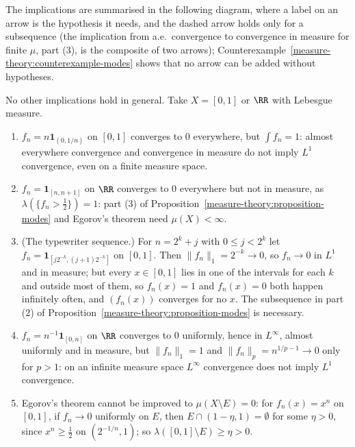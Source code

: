 The implications are summarised in the following diagram, where a label on an arrow is the hypothesis it needs, and the dashed arrow holds only for a subsequence (the
implication from a.e.\ convergence to convergence in measure for finite $\mu$, part (3), is the composite of two arrows); Counterexample~\ref{measure-theory:counterexample-modes} shows that no arrow can be added
without hypotheses.
\begin{center}
\end{center}

\begin{counterexample}\label{measure-theory:counterexample-modes}
No other implications hold in general. Take $X = [0, 1]$ or $\RR$ with Lebesgue measure.
\begin{enumerate}
\item $f_n = n\mathbf{1}_{(0, 1/n)}$ on $[0, 1]$ converges to $0$ everywhere, but $\int f_n = 1$: almost everywhere convergence and convergence in measure do not imply $L^1$ convergence, even on a finite measure space.
\item $f_n = \mathbf{1}_{[n, n+1]}$ on $\RR$ converges to $0$ everywhere but not in measure, as $\lambda(\{f_n > \frac12\}) = 1$: part (3) of Proposition~\ref{measure-theory:proposition-modes} and Egorov's theorem need $\mu(X) < \infty$.
\item (The typewriter sequence.) For $n = 2^k + j$ with $0 \leq j < 2^k$ let $f_n = \mathbf{1}_{[j2^{-k}, (j+1)2^{-k}]}$ on $[0, 1]$. Then $\|f_n\|_1 = 2^{-k} \to 0$, so $f_n \to 0$ in $L^1$ and in measure; but every $x \in [0, 1]$ lies in one of the
intervals for each $k$ and outside most of them, so $f_n(x) = 1$ and $f_n(x) = 0$ both happen infinitely often, and $(f_n(x))$ converges for no $x$. The subsequence in part (2) of
Proposition~\ref{measure-theory:proposition-modes} is necessary.
\item $f_n = n^{-1}\mathbf{1}_{[0, n]}$ on $\RR$ converges to $0$ uniformly, hence in $L^\infty$, almost uniformly and in measure, but $\|f_n\|_1 = 1$ and $\|f_n\|_p = n^{1/p - 1} \to 0$ only for
$p > 1$: on an infinite measure space $L^\infty$ convergence does not imply $L^1$ convergence.
\item Egorov's theorem cannot be improved to $\mu(X \setminus E) = 0$: for $f_n(x) = x^n$ on $[0, 1]$, if $f_n \to 0$ uniformly on $E$, then $E \cap (1 - \eta, 1) = \emptyset$ for some $\eta > 0$, since
$x^n \geq \frac12$ on $(2^{-1/n}, 1)$; so $\lambda([0, 1] \setminus E) \geq \eta > 0$.
\end{enumerate}
\end{counterexample}

